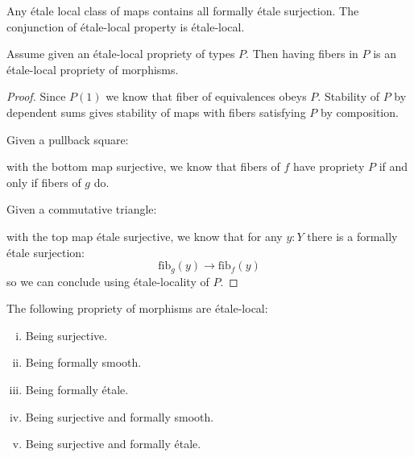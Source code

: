 Any étale local class of maps contains all formally étale surjection. The conjunction of étale-local property is étale-local.

\begin{lemma}\label{etale-local-morphisms-from-types}
Assume given an étale-local propriety of types $P$. Then having fibers in $P$ is an étale-local propriety of morphisms. 
\end{lemma}

\begin{proof}
Since $P(1)$ we know that fiber of equivalences obeys $P$. Stability of $P$ by dependent sums gives stability of maps with fibers satisfying $P$ by composition.

Given a pullback square:
  \begin{center}
  \end{center}
  with the bottom map surjective, we know that fibers of $f$ have propriety $P$ if and only if fibers of $g$ do.
  
  Given a commutative triangle:
    \begin{center}
  \end{center}
  with the top map étale surjective, we know that for any $y:Y$ there is a formally étale surjection:
  \[\mathrm{fib}_g(y) \to \mathrm{fib}_f(y)\]
  so we can conclude using étale-locality of $P$.
\end{proof}

\begin{lemma}\label{etale-local-class-maps}
The following propriety of morphisms are étale-local:
\begin{enumerate}[(i)]
\item Being surjective.
\item Being formally smooth.
\item Being formally étale.
\item Being surjective and formally smooth.
\item Being surjective and formally étale.
\end{enumerate}
\end{lemma}

